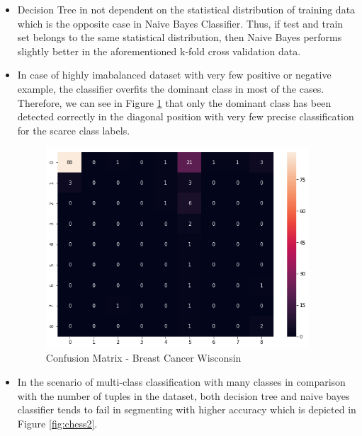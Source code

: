 \documentclass[12pt]{article}
\begin{document}
\begin{itemize}
	\item Decision Tree in not dependent on the statistical distribution of training data which is the opposite case in Naive Bayes Classifier. Thus, if test and train set belongs to the same statistical distribution, then Naive Bayes performs slightly better in the aforementioned k-fold cross validation data. 
	
	\item In case of highly imabalanced dataset with very few positive or negative example, the classifier overfits the dominant class in most of the cases. Therefore, we can see in Figure \ref{fig:BreastCancerWisconsin} that only the dominant class has been detected correctly in the diagonal position with very few precise classification for the scarce class labels.


\begin{figure}[H]
	\centering
	\includegraphics[width = .7\columnwidth, height = 7.5cm]{BreastCancerWisconsin.png}
	\caption{Confusion Matrix - Breast Cancer Wisconsin}
	\label{fig:BreastCancerWisconsin}
\end{figure}

\item In the scenario of multi-class classification with many classes in comparison with the number of tuples in the dataset, both decision tree and naive bayes classifier tends to fail in segmenting with higher accuracy which is depicted in Figure \ref{fig:chess2}.  


\end{itemize}
\end{document}
